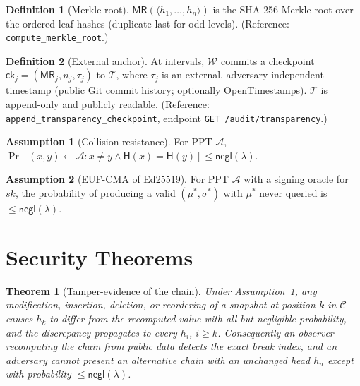\documentclass[11pt,a4paper]{article}
\theoremstyle{plain}
\newtheorem{theorem}{Theorem}
\theoremstyle{definition}
\newtheorem{definition}{Definition}
\newtheorem{assumption}{Assumption}
\theoremstyle{remark}
\newcommand{\Adv}{\mathcal{A}}
\newcommand{\negl}{\mathsf{negl}}
\newcommand{\Hash}{\mathsf{H}}
\newcommand{\code}[1]{\texttt{#1}}
\begin{document}
\begin{definition}[Merkle root]
$\mathsf{MR}(\langle h_1,\dots,h_n\rangle)$ is the SHA-256 Merkle root
over the ordered leaf hashes (duplicate-last for odd levels).
(Reference: \code{compute\_merkle\_root}.)
\end{definition}

\begin{definition}[External anchor]
At intervals, $\mathcal{W}$ commits a checkpoint
$\mathsf{ck}_j = (\mathsf{MR}_j, n_j, \tau_j)$ to $\mathcal{T}$, where
$\tau_j$ is an external, adversary-independent timestamp (public Git
commit history; optionally OpenTimestamps). $\mathcal{T}$ is append-only
and publicly readable. (Reference: \code{append\_transparency\_checkpoint},
endpoint \code{GET /audit/transparency}.)
\end{definition}

\begin{assumption}[Collision resistance]
\label{ass:cr}
For PPT $\Adv$, $\Pr[(x,y)\leftarrow\Adv : x\neq y \wedge
\Hash(x)=\Hash(y)] \le \negl(\lambda)$.
\end{assumption}

\begin{assumption}[EUF-CMA of Ed25519]
\label{ass:euf}
For PPT $\Adv$ with a signing oracle for $sk$, the probability of
producing a valid $(\mu^{*},\sigma^{*})$ with $\mu^{*}$ never queried is
$\le \negl(\lambda)$.
\end{assumption}

\section{Security Theorems}
\label{sec:theorems}

\begin{theorem}[Tamper-evidence of the chain]
\label{thm:t1}
Under Assumption~\ref{ass:cr}, any modification, insertion, deletion, or
reordering of a snapshot at position $k$ in $\mathcal{C}$ causes
$h_k$ to differ from the recomputed value with all but negligible
probability, and the discrepancy propagates to every $h_{i}$, $i\ge k$.
Consequently an observer recomputing the chain from public data detects
the exact break index, and an adversary cannot present an alternative
chain with an unchanged head $h_n$ except with probability
$\le\negl(\lambda)$.
\end{theorem}
\end{document}
